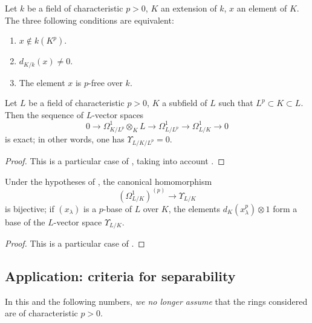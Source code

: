 \begin{corollary}[21.4.6]
\label{0.21.4.6}
Let $k$ be a field of characteristic $p>0$, $K$ an extension of $k$, $x$ an element of $K$.
The three following conditions are equivalent:
\begin{enumerate}
  \item[\rm a)] $x\notin k(K^p)$.
  \item[\rm b)] $d_{K/k}(x)\neq 0$.
  \item[\rm c)] The element $x$ is $p$-free over $k$.
\end{enumerate}
\end{corollary}

\begin{proposition}[21.4.7]
\label{0.21.4.7}
Let $L$ be a field of characteristic $p>0$, $K$ a subfield of $L$ such that $L^p\subset K\subset L$.
Then the sequence of $L$-vector spaces
\begin{equation}
\tag{21.4.7.1}
  \label{0.21.4.7.1}
  0\to\Omega^1_{K/L^p}\otimes_K L\to\Omega^1_{L/L^p}\to\Omega^1_{L/K}\to 0
\end{equation}
is exact; in other words, one has $\Upsilon_{L/K/L^p}=0$.
\end{proposition}

\begin{proof}
This is a particular case of , taking into account .
\end{proof}

\begin{proposition}[21.4.8]
\label{0.21.4.8}
Under the hypotheses of , the canonical homomorphism
\begin{equation}
\tag{21.4.8.1}
  \label{0.21.4.8.1}
  (\Omega^1_{L/K})^{(p)}\to\Upsilon_{L/K}
\end{equation}
is bijective; if $(x_\lambda)$ is a $p$-base of $L$ over $K$, the elements $d_K(x^p_\lambda)\otimes 1$ form a base of the $L$-vector space $\Upsilon_{L/K}$.
\end{proposition}

\begin{proof}
This is a particular case of .
\end{proof}

\subsection{Application: criteria for separability}
\label{subsection:0.21.5}

In this and the following numbers, \emph{we no longer assume} that the rings considered are of characteristic $p>0$.

